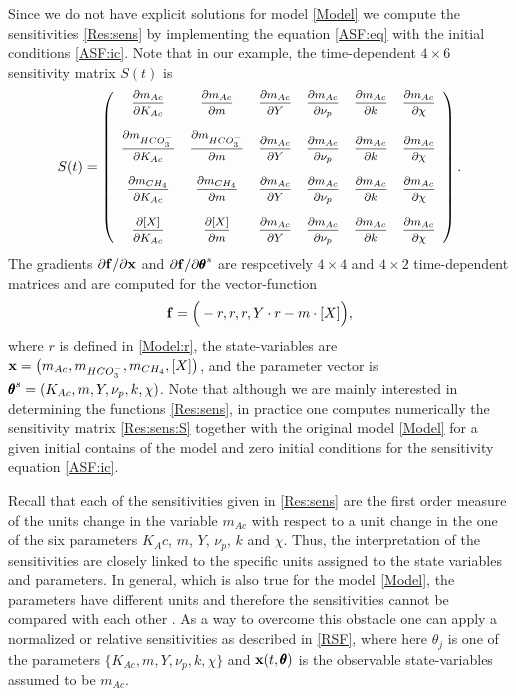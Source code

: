 \documentclass[a4paper, 12pt]{article}
\begin{document}
Since we do not have explicit solutions for model \eqref{Model} we compute the sensitivities \eqref{Res:sens} by implementing the equation \eqref{ASF:eq} with the initial conditions \eqref{ASF:ic}. Note that in our example, the time-dependent $4\times6$ sensitivity matrix $S(t)$ is
\begin{equation}\label{Res:sens:S}
{\footnotesize
S(t)= 
\left(\begin{array}{cccccccc}
\dfrac{\partial m_{Ac}}{\partial K_{Ac}} 		& \dfrac{\partial m_{Ac}}{\partial m} 			& \dfrac{\partial m_{Ac}}{\partial Y} 		& \dfrac{\partial m_{Ac}}{\partial\nu_p} 		& \dfrac{\partial m_{Ac}}{\partial k} 		& \dfrac{\partial m_{Ac}}{\partial\chi}  \\
\\
\dfrac{\partial m_{HCO_3^-}}{\partial K_{Ac}} 	& \dfrac{\partial m_{HCO_3^-}}{\partial m} 	&  \dfrac{\partial m_{Ac}}{\partial Y} 		& \dfrac{\partial m_{Ac}}{\partial\nu_p} 		& \dfrac{\partial m_{Ac}}{\partial k} 		& \dfrac{\partial m_{Ac}}{\partial\chi} \\
\\
\dfrac{\partial m_{CH_4}}{\partial K_{Ac}} 		& \dfrac{\partial m_{CH_4}}{\partial m} 		&  \dfrac{\partial m_{Ac}}{\partial Y} 		& \dfrac{\partial m_{Ac}}{\partial\nu_p} 		& \dfrac{\partial m_{Ac}}{\partial k} 		& \dfrac{\partial m_{Ac}}{\partial\chi} \\
\\
\dfrac{\partial[X]}{\partial K_{Ac}} 			& \dfrac{\partial[X]}{\partial m} 				& \dfrac{\partial m_{Ac}}{\partial Y} 		& \dfrac{\partial m_{Ac}}{\partial\nu_p}		& \dfrac{\partial m_{Ac}}{\partial k} 		& \dfrac{\partial m_{Ac}}{\partial\chi}  \\
\end{array}\right).	
}
\end{equation}
The gradients $\partial \mathbf{f}/\partial\mathbf{x}$ and $\partial \mathbf{f}/\partial{\pmb{\theta}}^s$ are respcetively $4\times4$  and $4\times2$ time-dependent matrices and are computed for the vector-function 
\[
\mathbf{f} = \Big(-r, r, r, Y\cdot r -m\cdot [X]\Big),
\]
where $r$ is defined in \eqref{Model:r},  the state-variables are $\mathbf{x} = \big(m_{Ac}, m_{HCO_3^-}, m_{CH_4} ,[X] \big)$, and the parameter vector is ${\pmb{\theta}}^s = (K_{Ac},m,Y,\nu_p,k,\chi)$. Note that although we are mainly interested in determining the functions \eqref{Res:sens}, in practice one computes numerically the sensitivity matrix \eqref{Res:sens:S} together with the original model \eqref{Model} for a given initial contains of the model and zero initial conditions for the sensitivity equation \eqref{ASF:ic}.

\smallskip

Recall that each of the sensitivities given in \eqref{Res:sens} are the first order measure of the units change in the variable $m_{Ac}$ with respect to a unit change in the one of the six parameters  $K_Ac$, $m$, $Y$,  $\nu_p$, $k$ and $\chi$. Thus, the interpretation of the sensitivities are closely linked to the specific units assigned to the state variables and parameters. In general, which is also true for the model \eqref{Model},  the parameters have different units and therefore the sensitivities cannot be compared with each other \cite{Rabitz1983, Banks2007a}.  As a way to overcome this obstacle one can apply a normalized or relative sensitivities as described in \eqref{RSF}, where here $\theta_j$ is one of the parameters $\{K_{Ac}, m, Y, \nu_p, k, \chi\}$ and $\mathbf{x}(t,{\pmb{\theta}})$ is the observable state-variables assumed to be  $m_{Ac}$.  
\end{document}
